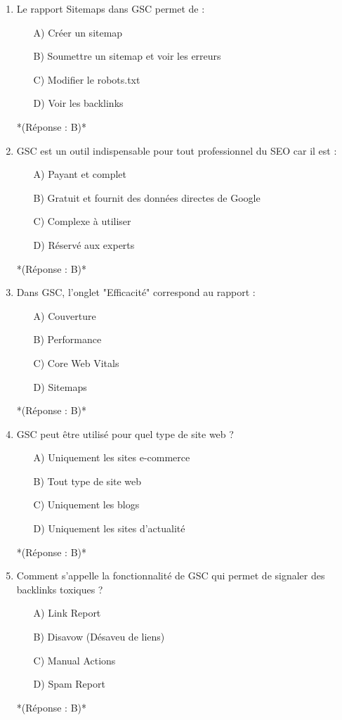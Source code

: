 \documentclass[12pt,a4paper,twoside]{report}
\begin{document}
\begin{enumerate}
    \item Le rapport Sitemaps dans GSC permet de :
    \begin{itemize}
        \item[A)] Créer un sitemap
        \item[B)] Soumettre un sitemap et voir les erreurs
        \item[C)] Modifier le robots.txt
        \item[D)] Voir les backlinks
    \end{itemize}
    *(Réponse : B)*

    \item GSC est un outil indispensable pour tout professionnel du SEO car il est :
    \begin{itemize}
        \item[A)] Payant et complet
        \item[B)] Gratuit et fournit des données directes de Google
        \item[C)] Complexe à utiliser
        \item[D)] Réservé aux experts
    \end{itemize}
    *(Réponse : B)*

    \item Dans GSC, l'onglet "Efficacité" correspond au rapport :
    \begin{itemize}
        \item[A)] Couverture
        \item[B)] Performance
        \item[C)] Core Web Vitals
        \item[D)] Sitemaps
    \end{itemize}
    *(Réponse : B)*

    \item GSC peut être utilisé pour quel type de site web ?
    \begin{itemize}
        \item[A)] Uniquement les sites e-commerce
        \item[B)] Tout type de site web
        \item[C)] Uniquement les blogs
        \item[D)] Uniquement les sites d'actualité
    \end{itemize}
    *(Réponse : B)*

    \item Comment s'appelle la fonctionnalité de GSC qui permet de signaler des backlinks toxiques ?
    \begin{itemize}
        \item[A)] Link Report
        \item[B)] Disavow (Désaveu de liens)
        \item[C)] Manual Actions
        \item[D)] Spam Report
    \end{itemize}
    *(Réponse : B)*


\end{enumerate}
\end{document}
